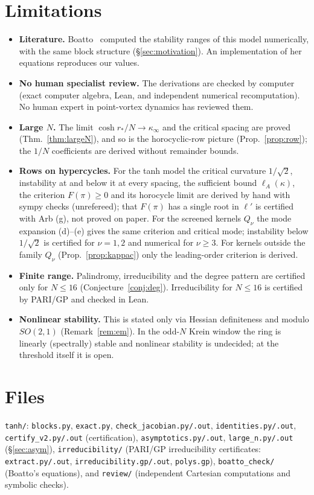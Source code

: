 \documentclass[11pt]{article}
\theoremstyle{remark}
\begin{document}
\section{Limitations}
\begin{itemize}
\item \textbf{Literature.} Boatto~\cite{Boatto} computed the stability ranges of this model numerically, with the same
block structure (\S\ref{sec:motivation}). An implementation of her equations reproduces our values.
\item \textbf{No human specialist review.} The derivations are checked by computer (exact computer algebra, Lean, and
independent numerical recomputation). No human expert in point-vortex dynamics has reviewed them.
\item \textbf{Large $N$.} The limit $\cosh r_*/N\to\kappa_\infty$ and the critical spacing are proved
(Thm.~\ref{thm:largeN}), and so is the horocyclic-row picture (Prop.~\ref{prop:row}); the $1/N$ coefficients are derived
without remainder bounds.
\item \textbf{Rows on hypercycles.} For the tanh model the critical curvature $1/\sqrt2$, instability at and below it at every
spacing, the sufficient bound $\ell_A(\kappa)$, the criterion $F(\pi)\ge0$ and its horocycle limit are derived by hand with
sympy checks (unrefereed); that $F(\pi)$ has a single root in $\ell'$ is certified with Arb (g), not proved on paper. For the screened kernels $Q_\nu$
the mode expansion (d)--(e) gives the same criterion and critical mode; instability below $1/\sqrt2$ is certified for
$\nu=1,2$ and numerical for $\nu\ge3$. For kernels outside the family $Q_\nu$ (Prop.~\ref{prop:kappac}) only the leading-order criterion is derived.
\item \textbf{Finite range.} Palindromy, irreducibility and the degree pattern are certified only for
$N\le16$ (Conjecture~\ref{conj:deg}). Irreducibility for $N\le16$ is certified by PARI/GP and checked in Lean.
\item \textbf{Nonlinear stability.} This is stated only via Hessian definiteness and modulo $SO(2,1)$ (Remark~\ref{rem:em}). In the
odd-$N$ Krein window the ring is linearly (spectrally) stable and nonlinear stability is undecided; at the threshold
itself it is open.
\end{itemize}

\section*{Files}
\texttt{tanh/}: \texttt{blocks.py}, \texttt{exact.py},
\texttt{check\_jacobian.py/.out}, \texttt{identities.py/.out}, \texttt{certify\_v2.py/.out} (certification),
\texttt{asymptotics.py/.out}, \texttt{large\_n.py/.out} (\S\ref{sec:asym}), \texttt{irreducibility/} (PARI/GP irreducibility certificates: \texttt{extract.py/.out},
\texttt{irreducibility.gp/.out}, \texttt{polys.gp}), \texttt{boatto\_check/} (Boatto's equations), and \texttt{review/}
(independent Cartesian computations and symbolic checks).
\end{document}
